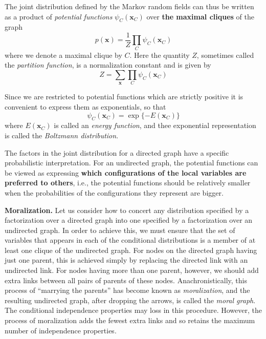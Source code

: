 \documentclass[a4paper]{report}
\renewcommand{\bf}{\mathbf}
\newcommand{\imp}[1]{{\color{blue}\textit{#1}}}
\begin{document}
The joint distribution defined by the Markov random fields can thus be written as a product of \imp{potential functions} $\psi_C(\bf{x}_C)$ over \textbf{the maximal cliques} of the graph
\begin{equation}
	p(\bf{x}) = \frac{1}{Z} \prod_C \psi_C(\bf{x}_C)
\end{equation}
where we denote a maximal clique by $C$. Here the quantity $Z$, sometimes called the \imp{partition function}, is a normalization constant and is given by
\begin{equation}
	Z = \sum_{\bf{x}} \prod_C \psi_C(\bf{x}_C)
\end{equation}

Since we are restricted to potential functions which are strictly positive it is convenient to express them as exponentials, so that
\begin{equation}
	\psi_C(\bf{x}_C) = \exp \{ -E(\bf{x}_C) \}
\end{equation}
where $E(\bf{x}_C)$ is called an \imp{energy function}, and thee exponential representation is called the \imp{Boltzmann distribution}.

The factors in the joint distribution for a directed graph have a specific probabilistic interpretation. For an undirected graph, the potential functions can be viewed as expressing \textbf{which configurations of the local variables are preferred to others}, i.e., the potential functions should be relatively smaller when the probabilities of the configurations they represent are bigger.

\textbf{Moralization.} Let us consider how to concert any distribution specified by a factorization over a directed graph into one specified by a factorization over an undirected graph. In order to achieve this, we must ensure that the set of variables that appears in each of the conditional distributions is a member of at least one clique of the undirected graph. For nodes on the directed graph having just one parent, this is achieved simply by replacing the directed link with an undirected link. For nodes having more than one parent, however, we should add extra links between all pairs of parents of these nodes. Anachronistically, this process of ``marrying the parents'' has become known as \imp{moralization}, and the resulting undirected graph, after dropping the arrows, is called the \imp{moral graph}. The conditional independence properties may loss in this procedure. However, the process of moralization adds the fewest extra links and so retains the maximum number of independence properties.
\end{document}
